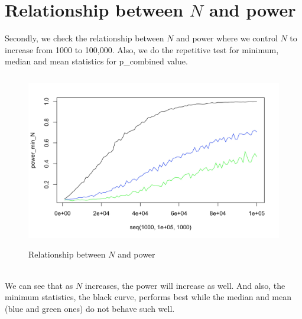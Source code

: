 \documentclass[10pt,english]{article}\usepackage{graphicx, color}
\numberwithin{equation}{section}
\numberwithin{figure}{section}
\begin{document}
\section{Relationship between $N$ and power}
Secondly, we check the relationship between $N$ and power where we control $N$ to increase from 1000 to 100,000. Also, we do the repetitive test for minimum, median and mean statistics for p\_combined value.\\
\begin{figure}[htbp]
\centering\includegraphics[width=4.5in, height=3in]{N}
\caption{Relationship between $N$ and power}
\end{figure}
\quad\\
We can see that as $N$ increases, the power will increase as well. And also, the minimum statistics, the black curve, performs best while the median and mean (blue and green ones) do not behave such well.
\end{document}
